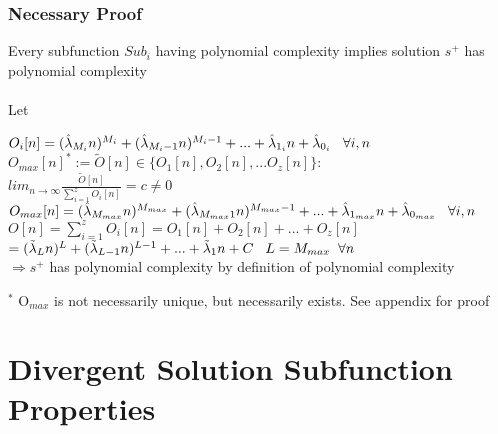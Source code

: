 \documentclass[11pt]{article}
\begin{document}
\subsubsection{Necessary Proof}
Every subfunction $Sub_i$ having polynomial complexity implies solution $s^+$ has polynomial complexity\\ \\
Let
\begin{center}
\vspace{4mm}
$
O_i[n] = (\hat{\lambda}_{M_i} n)^{M_i} + (\hat{\lambda}_{M_i-1} n)^{M_i-1} + ... + \hat{\lambda}_{1_i} n + \hat{\lambda}_{0_i} \hspace{3mm} \forall i,n
$
\\ \vspace{6mm}
$
O_{max}[n]^* := \tilde{O}[n] \in \{O_1[n],O_2[n],...O_z[n]\} :
$
\\ \vspace{6mm}
$
lim_{n\rightarrow \infty}\frac{\tilde{O}[n]}{\sum_{i=1}^z O_i[n]} = c \neq 0
$
\\ \vspace{6mm}
$
O_{max}[n] = (\hat{\lambda}_{M_{max}} n)^{M_{max}} + (\hat{\lambda}_{M_{max} 1} n)^{M_{max}-1} + ... + \hat{\lambda}_{1_{max}} n + \hat{\lambda}_{0_{max}} \hspace{3mm} \forall i,n
$
\\ \vspace{10mm}
$
O[n] = \sum_{i=1}^z O_i[n] = O_1[n] + O_2[n] + ... + O_z[n]
$
\\ \vspace{6mm}
$
= (\tilde{\lambda}_L n)^L + (\tilde{\lambda}_{L-1} n)^{L-1} + ... + \tilde{\lambda}_1 n + C \hspace{3mm} L = M_{max} \hspace{2mm} \forall n
$
\\ \vspace{8mm}
$
\Rightarrow s^+$ has polynomial complexity by definition of polynomial complexity
\end{center}
\vspace{4mm}$^*$ O$_{max}$ is not necessarily unique, but necessarily exists. See appendix for proof


\newpage 
\section{Divergent Solution Subfunction Properties}
\end{document}
